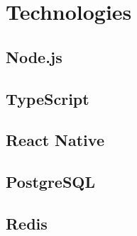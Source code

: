 \chapter{Technologies}
\label{chap:technologies}


\section{Node.js}
\label{sec:nodejs}


\section{TypeScript}
\label{sec:typescript}


\section{React Native}
\label{sec:react-native}


\section{PostgreSQL}
\label{sec:postgresql}


\section{Redis}
\label{sec:redis}


